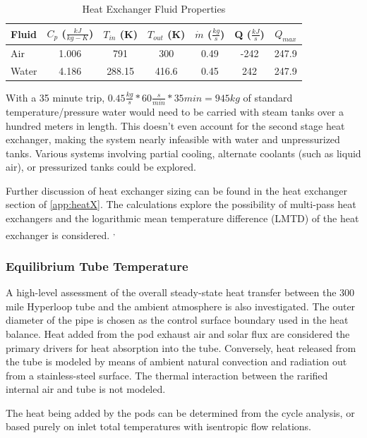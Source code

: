 \documentclass[heading.tex]{subfiles}
\begin{document}

\begin{table}
    \centering
    \caption{Heat Exchanger Fluid Properties}
    \label{tab:HeatEx}
    \begin{tabular}{l  c  c  c  c  c  c} 
        \hline
        Fluid & $C_{p}$ ($\frac{kJ}{kg-K}$)& $T_{in}$ (K) & $T_{out}$ (K) & $\dot{m}$ ($\frac{kg}{s}$) & Q ($\frac{kJ}{s}$) & $Q_{max}$\\ \hline 
        Air & 1.006 & 791 & 300 & 0.49 & -242 & 247.9\\ 
        Water & 4.186 & 288.15 & 416.6 &0.45 & 242 & 247.9\\ \hline
    \end{tabular}
\end{table}

With a 35 minute trip, $0.45 \frac{kg}{s} * 60 \frac{s}{min} * 35min = 945 kg$
of standard temperature/pressure water would need to be carried with steam tanks over a hundred meters in length.
This doesn't even account for the second stage heat exchanger, making the system nearly infeasible with water and unpressurized tanks.
Various systems involving partial cooling, alternate coolants (such as liquid air), or pressurized tanks could be explored.

Further discussion of heat exchanger sizing can be found in the heat exchanger section of \cref{app:heatX}.
The calculations explore the possibility of multi-pass heat exchangers
and the logarithmic mean temperature difference (LMTD) of the heat exchanger is considered.
\cite{Cengal}\textsuperscript{,}
\cite{Turns}


\subsubsection{Equilibrium Tube Temperature}
A high-level assessment of the overall steady-state heat transfer between the 300 mile Hyperloop tube and the ambient atmosphere is
also investigated. The outer diameter of the pipe is chosen as the control surface boundary used in the heat balance. Heat added from the pod exhaust
air and solar flux are considered the primary drivers for heat absorption into the tube. Conversely, heat released from the tube is modeled by means of
ambient natural convection and radiation out from a stainless-steel surface. The thermal interaction between the rarified internal air and
tube is not modeled.

The heat being added by the pods can be determined from the cycle analysis, or based purely on inlet total temperatures with isentropic
flow relations.
\end{document}
